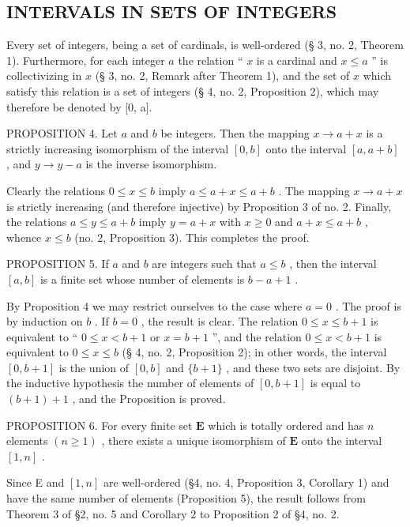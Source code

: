 \subsection{INTERVALS IN SETS OF INTEGERS}

Every set of integers, being a set of cardinals, is well-ordered (§ 3, no. 2, Theorem 1). Furthermore, for each integer \(a\) the relation `` \(x\) is a cardinal and \(x \leqslant a\) '' is collectivizing in \(x\) (§ 3, no. 2, Remark after Theorem 1), and the set of \(x\) which satisfy this relation is a set of integers (§ 4, no. 2, Proposition 2), which may therefore be denoted by {[}0, a{]}.

PROPOSITION 4. Let \(a\) and \(b\) be integers. Then the mapping \(x \to a + x\) is a strictly increasing isomorphism of the interval \([0, b]\) onto the interval \([a, a + b]\) , and \(y \to y - a\) is the inverse isomorphism.

Clearly the relations \(0 \leqslant x \leqslant b\) imply \(a \leqslant a + x \leqslant a + b\) . The mapping \(x \to a + x\) is strictly increasing (and therefore injective) by Proposition 3 of no. 2. Finally, the relations \(a \leqslant y \leqslant a + b\) imply \(y = a + x\) with \(x \geqslant 0\) and \(a + x \leqslant a + b\) , whence \(x \leqslant b\) (no. 2, Proposition 3). This completes the proof.

PROPOSITION 5. If \(a\) and \(b\) are integers such that \(a \leqslant b\) , then the interval \([a, b]\) is a finite set whose number of elements is \(b - a + 1\) .

By Proposition 4 we may restrict ourselves to the case where \(a=0\) . The proof is by induction on \(b\) . If \(b=0\) , the result is clear. The relation \(0 \leqslant x \leqslant b+1\) is equivalent to `` \(0 \leqslant x < b+1\) or \(x=b+1\) '', and the relation \(0 \leqslant x < b+1\) is equivalent to \(0 \leqslant x \leqslant b\) (§ 4, no. 2, Proposition 2); in other words, the interval \([0, b+1]\) is the union of \([0, b]\) and \(\{b+1\}\) , and these two sets are disjoint. By the inductive hypothesis the number of elements of \([0, b+1]\) is equal to \((b+1)+1\) , and the Proposition is proved.

PROPOSITION 6. For every finite set \(\mathbf{E}\) which is totally ordered and has \(n\) elements \((n \geqslant 1)\) , there exists a unique isomorphism of \(\mathbf{E}\) onto the interval \([1, n]\) .

Since E and \([1, n]\) are well-ordered (§4, no. 4, Proposition 3, Corollary 1) and have the same number of elements (Proposition 5), the result follows from Theorem 3 of §2, no. 5 and Corollary 2 to Proposition 2 of §4, no. 2.


